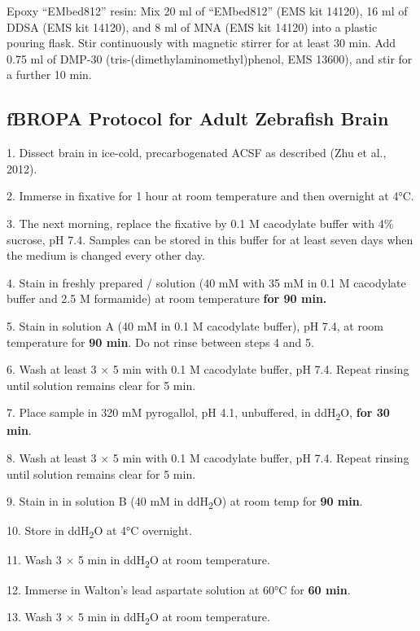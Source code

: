 \documentclass{article}
\newenvironment{steplist}{\par\setlength{\parindent}{0pt}\everypar{\hangindent=1.6em\hangafter=1\relax}}{\par\smallskip}
\begin{document}
Epoxy “EMbed812” resin: Mix 20 ml of “EMbed812” (EMS kit 14120), 16 ml of DDSA (EMS kit 14120), and 8 ml of MNA (EMS kit 14120) into a plastic pouring flask. Stir continuously with magnetic stirrer for at least 30 min. Add 0.75 ml of DMP-30 (tris-(dimethylaminomethyl)phenol, EMS 13600), and stir for a further 10 min.

\subsection*{fBROPA Protocol for Adult Zebrafish Brain}

\begin{steplist}
1. Dissect brain in ice-cold, precarbogenated ACSF as described (Zhu et al., 2012).

2. Immerse in fixative for 1 hour at room temperature and then overnight at 4°C.

3. The next morning, replace the fixative by 0.1 M cacodylate buffer with 4\% sucrose, pH 7.4. Samples can be stored in this buffer for at least seven days when the medium is changed every other day.

4. Stain in freshly prepared / solution (40 mM  with 35 mM  in 0.1 M cacodylate buffer and 2.5 M formamide) at room temperature \textbf{for 90 min.}

5. Stain in  solution A (40 mM  in 0.1 M cacodylate buffer), pH 7.4, at room temperature for \textbf{90 min}. Do not rinse between steps 4 and 5.

6. Wash at least 3 × 5 min with 0.1 M cacodylate buffer, pH 7.4. Repeat rinsing until solution remains clear for 5 min.

7. Place sample in 320 mM pyrogallol, pH 4.1, unbuffered, in ddH\textsubscript{2}O, \textbf{for 30 min}.

8. Wash at least 3 × 5 min with 0.1 M cacodylate buffer, pH 7.4. Repeat rinsing until solution remains clear for 5 min.

9. Stain in in  solution B (40 mM  in ddH\textsubscript{2}O) at room temp for \textbf{90 min}.

10. Store in ddH\textsubscript{2}O at 4°C overnight.

11. Wash 3 × 5 min in ddH\textsubscript{2}O at room temperature.

12. Immerse in Walton’s lead aspartate solution at 60°C for \textbf{60 min}.

13. Wash 3 × 5 min in ddH\textsubscript{2}O at room temperature.


\end{steplist}
\end{document}
